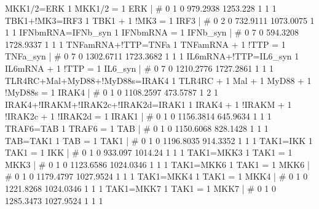 MKK1/2=ERK                                          	1 MKK1/2 = 1 ERK 	| 	# 	0              1              0       979.2938       1253.228              1              1              1 
TBK1+!MK3=IRF3                                      	1 TBK1 + 1 !MK3 = 1 IRF3 	| 	# 	0              2              0       732.9111      1073.0075              1              1              1 
IFNbmRNA=IFNb_syn                                   	1 IFNbmRNA = 1 IFNb_syn 	| 	# 	0              7              0       594.3208      1728.9337              1              1              1 
TNFamRNA+!TTP=TNFa                                  	1 TNFamRNA + 1 !TTP = 1 TNFa_syn 	| 	# 	0              7              0      1302.6711      1723.3682              1              1              1 
IL6mRNA+!TTP=IL6_syn                                	1 IL6mRNA + 1 !TTP = 1 IL6_syn 	| 	# 	0              7              0      1210.2776      1727.2861              1              1              1 
TLR4RC+Mal+MyD88+!MyD88s=IRAK4                      	1 TLR4RC + 1 Mal + 1 MyD88 + 1 !MyD88s = 1 IRAK4 	| 	# 	0              1              0      1108.2597       473.5787              1              2              1 
IRAK4+!IRAKM+!IRAK2c+!IRAK2d=IRAK1                  	1 IRAK4 + 1 !IRAKM + 1 !IRAK2c + 1 !IRAK2d = 1 IRAK1 	| 	# 	0              1              0      1156.3814       645.9634              1              1              1 
TRAF6=TAB                                           	1 TRAF6 = 1 TAB 	| 	# 	0              1              0      1150.6068       828.1428              1              1              1 
TAB=TAK1                                            	1 TAB = 1 TAK1 	| 	# 	0              1              0      1196.8035       914.3352              1              1              1 
TAK1=IKK                                            	1 TAK1 = 1 IKK 	| 	# 	0              1              0        933.097        1014.24              1              1              1 
TAK1=MKK3                                           	1 TAK1 = 1 MKK3 	| 	# 	0              1              0      1123.6586      1024.0346              1              1              1 
TAK1=MKK6                                           	1 TAK1 = 1 MKK6 	| 	# 	0              1              0      1179.4797      1027.9524              1              1              1 
TAK1=MKK4                                           	1 TAK1 = 1 MKK4 	| 	# 	0              1              0      1221.8268      1024.0346              1              1              1 
TAK1=MKK7                                           	1 TAK1 = 1 MKK7 	| 	# 	0              1              0      1285.3473      1027.9524              1              1              1 
